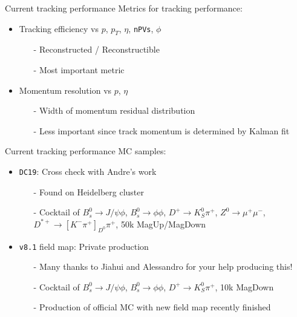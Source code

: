 \documentclass[xcolor={dvipsnames}]{beamer}
\begin{document}
\begin{frame}{Current tracking performance}
  \vspace{0.0cm}
  {\Large Metrics for tracking performance:}
  \vspace{0.2cm}
  \begin{itemize}
    \setlength\itemsep{1.0em}
    \item{Tracking efficiency vs $p$, $p_T$, $\eta$, \texttt{nPVs}, $\phi$}
    \begin{itemize}
      \item[-]{Reconstructed / Reconstructible}
      \item[-]{Most important metric}
    \end{itemize}
    \item{Momentum resolution vs $p$, $\eta$}
    \begin{itemize}
      \item[-]{Width of momentum residual distribution}
      \item[-]{Less important since track momentum is determined by Kalman fit}
    \end{itemize}
  \end{itemize}
\end{frame}

\begin{frame}{Current tracking performance}
  \vspace{0.0cm}
  {\Large MC samples:}
  \vspace{0.2cm}
  \begin{itemize}
    \setlength\itemsep{1.0em}
    \item{\texttt{DC19}: Cross check with Andre's work}
    \begin{itemize}
      \item[-]{Found on Heidelberg cluster}
      \item[-]{Cocktail of $B_s^0\to J/\psi\phi$, $B_s^0\to\phi\phi$, $D^+\to K_S^0\pi^+$, $Z^0\to\mu^+\mu^-$, $D^{\ast+}\to[K^-\pi^+]_{D^0}\pi^+$, 50k MagUp/MagDown}
    \end{itemize}
    \item{\texttt{v8.1} field map: Private production}
    \begin{itemize}
      \item[-]{Many thanks to Jiahui and Alessandro for your help producing this!}
      \item[-]{Cocktail of $B_s^0\to J/\psi\phi$, $B_s^0\to\phi\phi$, $D^+\to K_S^0\pi^+$, 10k MagDown}
      \item[-]{Production of official MC with new field map recently finished}
    \end{itemize}
  \end{itemize}
\end{frame}
\end{document}
